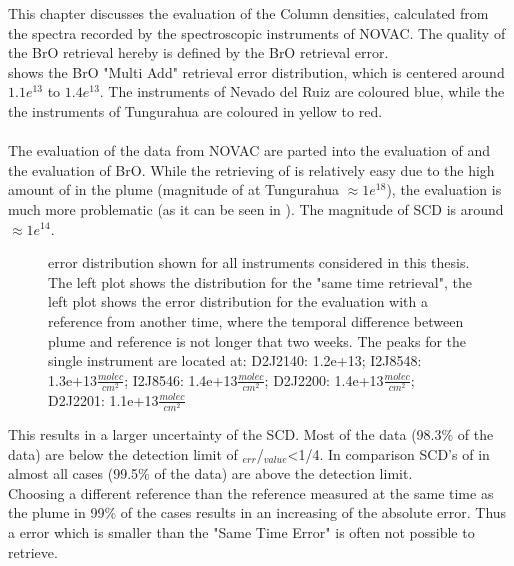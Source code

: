 This chapter discusses the evaluation of the  Column densities, calculated from the spectra recorded by the spectroscopic instruments of NOVAC. The quality of the BrO retrieval hereby is defined by the BrO retrieval error.\\
 shows the BrO "Multi Add" retrieval error distribution, which is centered around $1.1e^{13}$ to $1.4e^{13}$. The instruments of Nevado del Ruiz are coloured blue, while the the instruments of Tungurahua are coloured in yellow to red.\\
\\
The evaluation of the data from NOVAC are parted into the evaluation of  and the evaluation of BrO. While the retrieving of  is relatively easy due to the high amount of  in the plume (magnitude of  at Tungurahua $\approx 1e^{18}$), the  evaluation is much more problematic (as it can be seen in ). The magnitude of  SCD is around $\approx 1e^{14}$. \\
%
\begin{figure}
	\caption{ error distribution shown for all instruments considered in this thesis. The left plot shows the  distribution for the "same time retrieval", the left plot shows the  error distribution for the evaluation with a reference from another time, where the temporal difference between plume and reference is not longer that two weeks. 
	The peaks for the single instrument are located at: D2J2140: 1.2e+13;
		 I2J8548: 1.3e+13$\frac{molec}{cm^2}$;
		I2J8546: 1.4e+13$\frac{molec}{cm^2}$;
		D2J2200: 1.4e+13$\frac{molec}{cm^2}$;
		D2J2201: 1.1e+13$\frac{molec}{cm^2}$}
	\label{fig:allbroerrordistribution}
\end{figure}
%
This results in a larger uncertainty of the   SCD. Most of the  data (98.3\% of the data) are below the detection limit of $_{err}$/$_{value}$<1/4. In comparison SCD's of  in almost all cases (99.5\% of the data)  are above the detection limit. \\
%
Choosing a different reference than the reference measured at the same time as the plume in 99\% of the cases results in an increasing of the absolute error. 
Thus a  error which is smaller than the "Same Time Error" is often not  possible to retrieve. 
